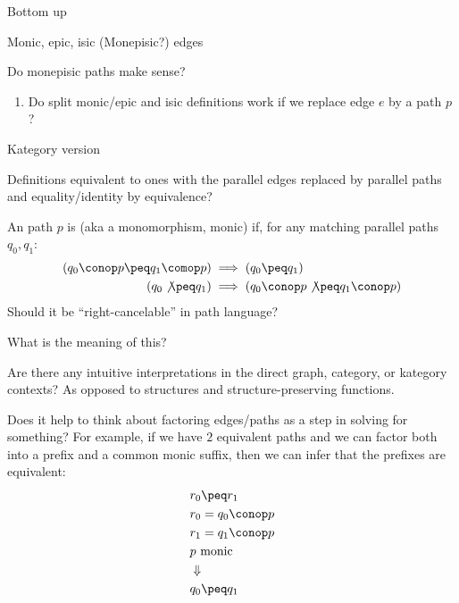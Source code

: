 \begin{plSection}{Bottom up}
\begin{plSection}{Monic, epic, isic (Monepisic?) edges}
\begin{plSection}{Do monepisic paths make sense?}
\begin{enumerate}
  In kategory language:
  \begin{align*}
  \left( q_0 \not\peq q_1 \right) 
  & \implies 
  \left( q_0 \conop p \not\peq q_1 \conop p \right)
  \\
  \left( q_0 \conop p \peq q_1 \conop p \right)
  & \implies 
  \left( q_0 \peq q_1 \right) 
  \end{align*}
  
  \item Do split monic/epic and isic definitions work if we replace
edge $e$ by a path $p$?
\end{enumerate}
\end{plSection}

\begin{plSection}{Kategory version}

Definitions equivalent to ones with the parallel
edges replaced by parallel paths and equality/identity 
by equivalence? 

An path $p$ is  (aka a monomorphism, monic)
if, for any matching parallel paths $q_0,q_1$:
\begin{align*}
\left( q_0 \conop p \peq q_1 \comop p \right) 
& 
\implies 
\left( q_0 \peq q_1 \right) 
\\
\left( q_0 \not\peq q_1 \right) 
& \implies 
\left( q_0 \conop p \not\peq q_1 \conop p \right) 
\end{align*}
Should it be ``right-cancelable'' in path language?

\end{plSection}
\begin{plSection}{What is the meaning of this?}

Are there any intuitive interpretations in the direct graph,
category, or kategory contexts? As opposed to 
structures and structure-preserving functions.

Does it help to think about factoring edges/paths
as a step in solving for something?
For example, if we have $2$ equivalent paths 
and we can factor both into a prefix and a common monic
suffix, then we can infer that the prefixes are equivalent:
\begin{align*}
& r_0 \peq r_1 \\
& r_0 = q_0 \conop p \\
& r_1 = q_1 \conop p \\
& p \text{ monic } \\
& \Downarrow \\
& q_0 \peq q_1
\end{align*}
\end{plSection}%
\end{plSection}
\end{plSection}%
